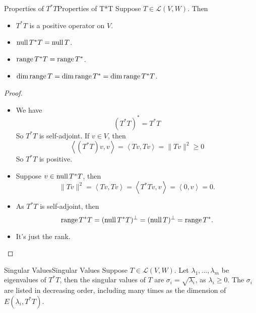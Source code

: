 \documentclass[../main.tex]{subfiles}
\begin{document}
\begin{theorem}{Properties of $T^*T$}{Properties of T*T}
Suppose $T\in \mathscr{L}(V,W)$. Then
\begin{itemize}
\item $T^*T$ is a positive operator on $V$.
\item $\operatorname{null} T^*T=\operatorname{null} T$.
\item $\operatorname{range} T^*T=\operatorname{range} T^*$.
\item $\dim \operatorname{range} T = \dim \operatorname{range} T^* = \dim \operatorname{range} T^*T$.
\end{itemize}
\end{theorem}
\begin{proof}
\begin{itemize}
\item We have
	\begin{equation*}
		(T^*T)^* = T^*T
	\end{equation*}
	So $T^*T$ is self-adjoint. If $v\in V$, then
	\begin{equation*}
	\left<(T^*T)v,v\right> = \left<Tv,Tv\right> = \|Tv\|^2 \geq 0
	\end{equation*}
	So  $T^*T$ is positive.
\item Suppose $v\in \operatorname{null} T^*T$, then
	\begin{equation*}
	\|Tv\|^2 = \left<Tv,Tv\right> = \left<T^*Tv,v\right> = \left<0,v\right> = 0.
	\end{equation*}
\item As $T^*T$ is self-adjoint, then
	\begin{equation*}
	\operatorname{range} T^*T = (\operatorname{null} T^*T)^{\perp} = (\operatorname{null} T)^{\perp} = \operatorname{range} T^*.
	\end{equation*}
\item It's just the rank.
\end{itemize}
\end{proof}

\begin{definition}{Singular Values}{Singular Values}
Suppose $T\in \mathscr{L}(V,W)$. Let $\lambda_1, \ldots ,\lambda_m$ be eigenvalues of $T^*T$, then the singular values of $T$ are $\sigma_i = \sqrt{\lambda_i}$, as $\lambda_i \geq 0$. The $\sigma_i$ are listed in decreasing order, including many times as the dimension of $E(\lambda_i,T^*T)$.
\end{definition}
\end{document}
